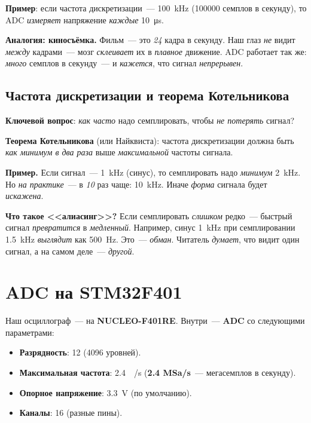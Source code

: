 \textbf{Пример}: если частота дискретизации~--- \SI{100}{\kilo\hertz}
(\num{100000} семплов в секунду), то ADC \emph{измеряет}
напряжение \emph{каждые} \SI{10}{\micro\second}.

\begin{ideabox}
\textbf{Аналогия: киносъёмка.} Фильм~--- это \emph{24}
кадра в секунду. Наш глаз \emph{не} видит \emph{между}
кадрами~--- мозг \emph{склеивает} их в \emph{плавное}
движение. ADC работает так же: \emph{много} семплов
в секунду~--- и \emph{кажется}, что сигнал \emph{непрерывен}.
\end{ideabox}

\subsection{Частота дискретизации и теорема Котельникова}

\textbf{Ключевой вопрос}: \emph{как часто} надо семплировать,
чтобы \emph{не потерять} сигнал?

\textbf{Теорема Котельникова} (или Найквиста): частота
дискретизации должна быть \emph{как минимум в два раза}
выше \emph{максимальной} частоты сигнала.

\begin{keybox}
\textbf{Пример.} Если сигнал~--- \SI{1}{\kilo\hertz} (синус),
то семплировать надо \emph{минимум} \SI{2}{\kilo\hertz}.
Но \emph{на практике}~--- в \emph{10} раз чаще: \SI{10}{\kilo\hertz}.
Иначе \emph{форма} сигнала будет \emph{искажена}.
\end{keybox}

\begin{warnbox}
\textbf{Что такое <<алиасинг>>?} Если семплировать \emph{слишком}
редко~--- быстрый сигнал \emph{превратится} в \emph{медленный}.
Например, синус \SI{1}{\kilo\hertz} при семплировании
\SI{1.5}{\kilo\hertz} \emph{выглядит} как \SI{500}{\hertz}.
Это~--- \emph{обман}. Читатель \emph{думает}, что видит
один сигнал, а на самом деле~--- \emph{другой}.
\end{warnbox}

\section{ADC на STM32F401}
\label{sec:adc-stm32}

Наш осциллограф~--- на \textbf{NUCLEO-F401RE}. Внутри~---
\textbf{ADC} со следующими параметрами:

\begin{itemize}
    \item \textbf{Разрядность}: \SI{12}{\bit} (4096 уровней).
    \item \textbf{Максимальная частота}: \SI{2.4}{\mega\sample/\second}
      (\textbf{2.4 MSa/s}~--- мегасемплов в секунду).
    \item \textbf{Опорное напряжение}: \SI{3.3}{\volt} (по умолчанию).
    \item \textbf{Каналы}: \num{16} (разные пины).
\end{itemize}

